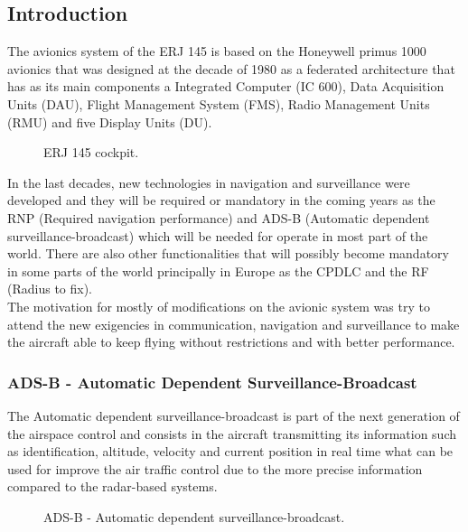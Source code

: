 \subsection{Introduction}

The avionics system of the ERJ 145 is based on the Honeywell primus 1000 avionics that was designed at the decade of 1980 as a federated architecture that has as its main components a Integrated Computer (IC 600), Data Acquisition Units (DAU), Flight Management System (FMS), Radio Management Units (RMU) and five Display Units (DU).

\begin{figure}[H] %
\caption{ERJ 145 cockpit.}
\label{fig:ERJ145Cockpit}
\end{figure}

In the last decades, new technologies in navigation and surveillance were developed and they will be required or mandatory in the coming years as the RNP (Required navigation performance) and ADS-B (Automatic dependent surveillance-broadcast) which will be needed for operate in most part of the world. There are also other functionalities that will possibly become mandatory in some parts of the world principally in Europe as the CPDLC and the RF (Radius to fix).
\\The motivation for mostly of modifications on the avionic system was try to attend the new exigencies in communication, navigation and surveillance to make the aircraft able to keep flying without restrictions and with better performance.

\subsubsection{ADS-B - Automatic Dependent Surveillance-Broadcast}
The Automatic dependent surveillance-broadcast is part of the next generation of the airspace control and consists in the aircraft transmitting its information such as identification, altitude, velocity and current position in real time what can be used for improve the air traffic control due to the more precise information compared to the radar-based systems.
\begin{figure}[H] %
\caption{ADS-B - Automatic dependent surveillance-broadcast.}
\label{fig:ADSBSchema}
\end{figure}

